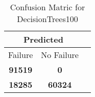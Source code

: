 \begin{table}[] 
\caption{Confusion Matric for DecisionTrees100} 
\label{Table: Prediction Accuracy-DMDDecisionTrees100OnlySunEKF-ignoreReflectionperfectNoFailurePrediction-Reflection} 
\centering 
\begin{tabular} 
 {@{}ccc@{}} 
\toprule 
\multicolumn{2}{c}{\textbf{Predicted}}
 \\ \midrule 
\multicolumn{1}{|c|}{Failure} & 
\multicolumn{1}{c|}{No Failure}
 \\ \midrule 
\multicolumn{1}{|c|}{\color{green}\textbf{91519}} & 
\multicolumn{1}{c|}{\color{red}\textbf{0}}
 \\ \midrule 
\multicolumn{1}{|c|}{\color{red}\textbf{18285}} & 
\multicolumn{1}{c|}{\color{green}\textbf{60324}}
 \\ \bottomrule 
\end{tabular} 
\end{table} 
